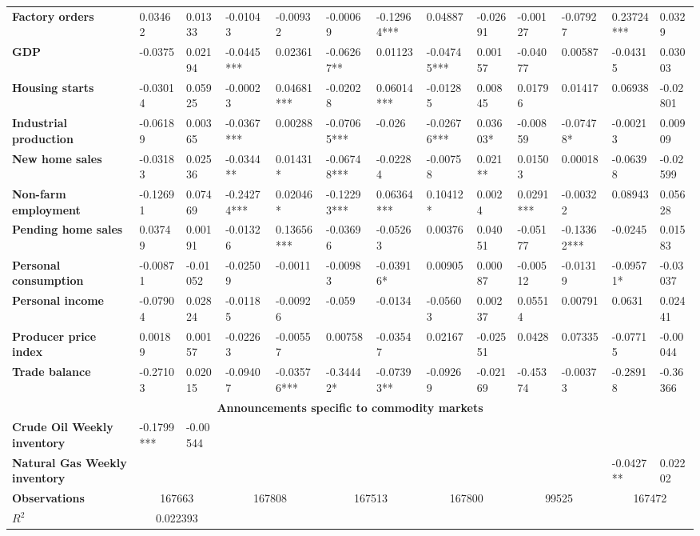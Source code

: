 \begin{sidewaystable}
{\begin{tabular}{@{}lllllllllllll@{}}
\textbf{Factory orders}& 0.03462 & 0.01333 & -0.01043 & -0.00932 & -0.00069 & -0.12964*** & 0.04887 & -0.02691 & -0.00127 & -0.07927 & 0.23724*** & 0.0329 \\ \textbf{GDP}& -0.0375 & 0.02194 & -0.0445*** & 0.02361 & -0.06267** & 0.01123 & -0.04745*** & 0.00157 & -0.04077 & 0.00587 & -0.04315 & 0.03003 \\ \textbf{Housing starts}& -0.03014 & 0.05925 & -0.00023 & 0.04681***& -0.02028 & 0.06014*** & -0.01285 & 0.00845 & 0.01796 & 0.01417 & 0.06938 & -0.02801 \\ \textbf{Industrial production}& -0.06189 & 0.00365 & -0.0367*** & 0.00288 & -0.07065*** & -0.026 & -0.02676*** & 0.03603* & -0.00859 & -0.07478* & -0.00213 & 0.00909 \\ \textbf{New home sales}& -0.03183 & 0.02536 & -0.0344** & 0.01431* & -0.06748*** & -0.02284 & -0.00758 & 0.021** & 0.01503 & 0.00018 & -0.06398 & -0.02599 \\ \textbf{Non-farm employment}& -0.12691 & 0.07469 & -0.24274*** & 0.02046* & -0.12293*** & 0.06364*** & 0.10412* & 0.0024 & 0.0291*** & -0.00322 & 0.08943 & 0.05628 \\ \textbf{Pending home sales}& 0.03749 & 0.00191 & -0.01326 & 0.13656***& -0.03696 & -0.05263 & 0.00376 & 0.04051 & -0.05177 & -0.13362*** & -0.0245 & 0.01583 \\ \textbf{Personal consumption}& -0.00871 & -0.01052 & -0.02509 & -0.0011 & -0.00983 & -0.03916* & 0.00905 & 0.00087 & -0.00512 & -0.01319 & -0.09571* & -0.03037 \\ \textbf{Personal income}& -0.07904 & 0.02824 & -0.01185 & -0.00926 & -0.059 & -0.0134 & -0.05603 & 0.00237 & 0.05514 & 0.00791 & 0.0631 & 0.02441 \\ \textbf{Producer price index}& 0.00189 & 0.00157 & -0.02263 & -0.00557 & 0.00758 & -0.03547 & 0.02167 & -0.02551 & 0.0428 & 0.07335 & -0.07715 & -0.00044 \\ \textbf{Trade balance}& -0.27103 & 0.02015 & -0.09407 & -0.03576*** & -0.34442* & -0.07393** & -0.09269 & -0.02169 & -0.45374 & -0.00373 & -0.28918 & -0.36366 \\  \midrule \multicolumn{13}{c}{\textbf{Announcements specific to commodity markets}} \\ \midrule \textbf{Crude Oil Weekly inventory}& -0.1799*** & -0.00544 &  &  &  &  &  &  &  &  &  &  \\ \textbf{Natural Gas Weekly inventory}&  &  &  &  &  &  &  &  &  &  & -0.0427** & 0.02202 \\  \midrule \textbf{Observations}             &\multicolumn{2}{c}{ 167663 }                                                 & \multicolumn{2}{c}{ 167808 }                                                 & \multicolumn{2}{c}{ 167513 }                                                 & \multicolumn{2}{c}{ 167800 }                                                 & \multicolumn{2}{c}{ 99525 }                                                   & \multicolumn{2}{c}{ 167472 }                                                 \\ \textbf{$R^2$}             &\multicolumn{2}{c}{ 0.022393 }                                                 & 
\end{tabular}}
\end{sidewaystable}
